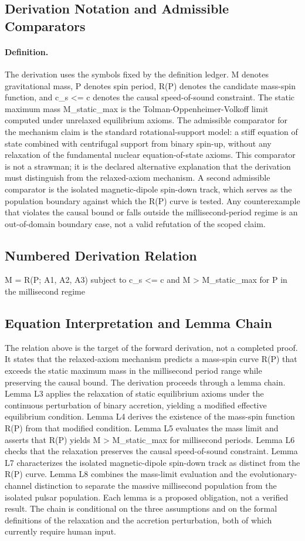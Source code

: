 \documentclass[conference]{IEEEtran}
\begin{document}
\subsection{Derivation Notation and Admissible Comparators}
\paragraph{Definition.} The derivation uses the symbols fixed by the definition ledger. M denotes gravitational mass, P denotes spin period, R(P) denotes the candidate mass-spin function, and c\_s <= c denotes the causal speed-of-sound constraint. The static maximum mass M\_static\_max is the Tolman-Oppenheimer-Volkoff limit computed under unrelaxed equilibrium axioms. The admissible comparator for the mechanism claim is the standard rotational-support model: a stiff equation of state combined with centrifugal support from binary spin-up, without any relaxation of the fundamental nuclear equation-of-state axioms. This comparator is not a strawman; it is the declared alternative explanation that the derivation must distinguish from the relaxed-axiom mechanism. A second admissible comparator is the isolated magnetic-dipole spin-down track, which serves as the population boundary against which the R(P) curve is tested. Any counterexample that violates the causal bound or falls outside the millisecond-period regime is an out-of-domain boundary case, not a valid refutation of the scoped claim.

\subsection{Numbered Derivation Relation}
M = R(P; A1, A2, A3) subject to c\_s <= c and M > M\_static\_max for P in the millisecond regime

\subsection{Equation Interpretation and Lemma Chain}
The relation above is the target of the forward derivation, not a completed proof. It states that the relaxed-axiom mechanism predicts a mass-spin curve R(P) that exceeds the static maximum mass in the millisecond period range while preserving the causal bound. The derivation proceeds through a lemma chain. Lemma L3 applies the relaxation of static equilibrium axioms under the continuous perturbation of binary accretion, yielding a modified effective equilibrium condition. Lemma L4 derives the existence of the mass-spin function R(P) from that modified condition. Lemma L5 evaluates the mass limit and asserts that R(P) yields M > M\_static\_max for millisecond periods. Lemma L6 checks that the relaxation preserves the causal speed-of-sound constraint. Lemma L7 characterizes the isolated magnetic-dipole spin-down track as distinct from the R(P) curve. Lemma L8 combines the mass-limit evaluation and the evolutionary-channel distinction to separate the massive millisecond population from the isolated pulsar population. Each lemma is a proposed obligation, not a verified result. The chain is conditional on the three assumptions and on the formal definitions of the relaxation and the accretion perturbation, both of which currently require human input.
\end{document}
